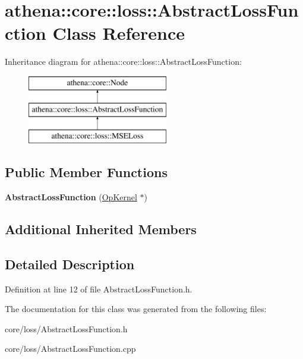 \hypertarget{classathena_1_1core_1_1loss_1_1_abstract_loss_function}{}\section{athena\+:\+:core\+:\+:loss\+:\+:Abstract\+Loss\+Function Class Reference}
\label{classathena_1_1core_1_1loss_1_1_abstract_loss_function}
Inheritance diagram for athena\+:\+:core\+:\+:loss\+:\+:Abstract\+Loss\+Function\+:\begin{figure}[H]
\begin{center}
\leavevmode
\includegraphics[height=3.000000cm]{d7/d32/classathena_1_1core_1_1loss_1_1_abstract_loss_function}
\end{center}
\end{figure}
\subsection*{Public Member Functions}
\begin{DoxyCompactItemize}
\item 
\mbox{\label{classathena_1_1core_1_1loss_1_1_abstract_loss_function_afdb95a15043e5b1951417e6453edd539}} 
{\bfseries Abstract\+Loss\+Function} (\mbox{\hyperlink{classathena_1_1core_1_1_op_kernel}{Op\+Kernel}} $\ast$)
\end{DoxyCompactItemize}
\subsection*{Additional Inherited Members}


\subsection{Detailed Description}


Definition at line 12 of file Abstract\+Loss\+Function.\+h.



The documentation for this class was generated from the following files\+:\begin{DoxyCompactItemize}
\item 
core/loss/Abstract\+Loss\+Function.\+h\item 
core/loss/Abstract\+Loss\+Function.\+cpp\end{DoxyCompactItemize}

